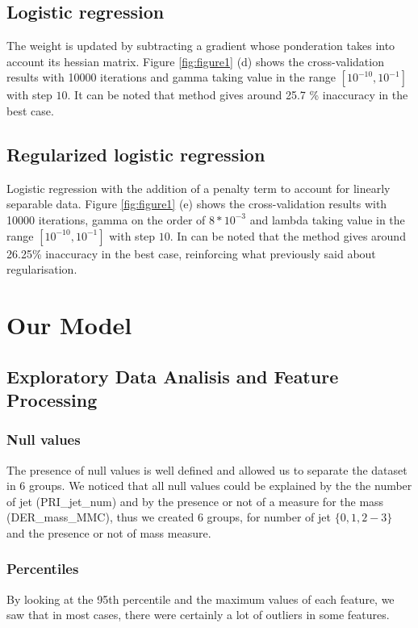 \documentclass[10pt,conference,compsocconf]{IEEEtran}
\begin{document}
\subsection{Logistic regression}
The weight is updated by subtracting a gradient whose ponderation takes into account its hessian matrix. Figure \ref{fig:figure1} (d) shows the cross-validation results with 10000 iterations and gamma taking value in the range $[10^{-10}, 10^{-1}]$ with step $10$. It can be noted that method gives around 25.7 \% inaccuracy in the best case.
\subsection{Regularized logistic regression}
Logistic regression with the addition of a penalty term to account for linearly separable data. Figure \ref{fig:figure1} (e) shows the cross-validation results with 10000 iterations, gamma on the order of $8*10^{-3}$ and lambda taking value in the range $[10^{-10}, 10^{-1}]$ with step $10$. In can be noted that the method gives around 26.25\% inaccuracy in the best case, reinforcing what previously said about regularisation.
\section{Our Model}
\subsection{Exploratory Data Analisis and Feature Processing}
\subsubsection{Null values}
The presence of null values is well defined and allowed us to separate the
dataset in 6 groups. We noticed that all null values could be
explained by the the number of jet (PRI\_jet\_num) and by the presence or not of a
measure for the mass (DER\_mass\_MMC), thus we created 6 groups, for number of jet
$\lbrace 0, 1, 2-3 \rbrace$ and the presence or not of mass measure.

\subsubsection{Percentiles}

By looking at the 95th percentile and the maximum values of each feature, we saw
that in most cases, there were certainly a lot of outliers in some features.
\end{document}
